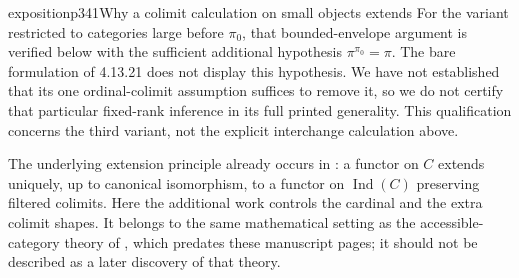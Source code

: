 \begin{dcomment}{exposition}{p341}{Why a colimit calculation on small objects extends}
For the variant restricted to categories large before $\pi_0$, that bounded-envelope argument is verified below with the sufficient additional hypothesis $\pi^{\pi_0}=\pi$. The bare formulation of 4.13.21 does not display this hypothesis. We have not established that its one ordinal-colimit assumption suffices to remove it, so we do not certify that particular fixed-rank inference in its full printed generality. This qualification concerns the third variant, not the explicit interchange calculation above.

The underlying extension principle already occurs in \citet[Expos\'e I, 8.7.2--8.7.3]{SGA4I1972}: a functor on $C$ extends uniquely, up to canonical isomorphism, to a functor on $\operatorname{Ind}(C)$ preserving filtered colimits. Here the additional work controls the cardinal and the extra colimit shapes. It belongs to the same mathematical setting as the accessible-category theory of \citet{MakkaiPare1989}, which predates these manuscript pages; it should not be described as a later discovery of that theory.
\end{dcomment}


